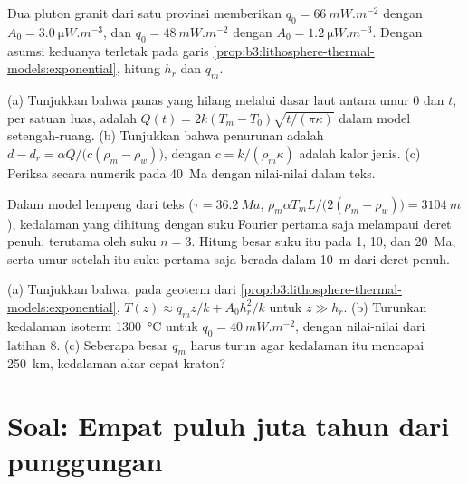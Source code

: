 \begin{exercise}[$\star\star$]\label{exo:b3:lithosphere-thermal-models:9}
Dua pluton granit dari satu provinsi memberikan $q_0 = \qty{66}{mW.m^{-2}}$ dengan $A_0
= \qty{3.0}{\micro W.m^{-3}}$, dan $q_0 = \qty{48}{mW.m^{-2}}$ dengan $A_0 =
\qty{1.2}{\micro W.m^{-3}}$. Dengan asumsi keduanya terletak pada garis
\cref{prop:b3:lithosphere-thermal-models:exponential}, hitung $h_r$ dan $q_m$.
\end{exercise}

\begin{exercise}[$\star\star\star$]\label{exo:b3:lithosphere-thermal-models:10}
(a) Tunjukkan bahwa panas yang hilang melalui dasar laut antara umur 0 dan $t$, per
satuan luas, adalah $Q(t) = 2k(T_m - T_0)\sqrt{t/(\pi\kappa)}$ dalam
model setengah-ruang. (b) Tunjukkan bahwa penurunan adalah $d - d_r = \alpha Q/\bigl(c(\rho_m -
\rho_w)\bigr)$, dengan $c = k/(\rho_m\kappa)$ adalah kalor jenis. (c) Periksa
secara numerik pada \qty{40}{Ma} dengan nilai-nilai dalam teks.
\end{exercise}

\begin{exercise}[$\star\star\star$]\label{exo:b3:lithosphere-thermal-models:11}
Dalam model lempeng dari teks ($\tau = \qty{36.2}{Ma}$, $\rho_m\alpha T_mL/
\bigl(2(\rho_m - \rho_w)\bigr) = \qty{3104}{m}$), kedalaman yang dihitung dengan
suku Fourier pertama saja melampaui deret penuh, terutama oleh suku $n = 3$.
Hitung besar suku itu pada 1, 10, dan \qty{20}{Ma}, serta umur
setelah itu suku pertama saja berada dalam \qty{10}{m} dari deret penuh.
\end{exercise}

\begin{exercise}[$\star\star\star$]\label{exo:b3:lithosphere-thermal-models:12}
(a) Tunjukkan bahwa, pada geoterm dari \cref{prop:b3:lithosphere-thermal-models:exponential},
$T(z) \approx q_mz/k + A_0h_r^2/k$ untuk $z \gg h_r$. (b) Turunkan kedalaman
isoterm \qty{1300}{\celsius} untuk $q_0 = \qty{40}{mW.m^{-2}}$, dengan nilai-nilai
dari latihan 8. (c) Seberapa besar $q_m$ harus turun agar kedalaman itu mencapai
\qty{250}{km}, kedalaman akar cepat kraton?
\end{exercise}

\section{Soal: Empat puluh juta tahun dari punggungan}

